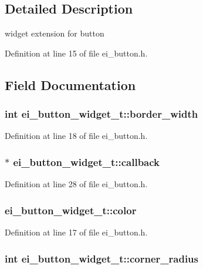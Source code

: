\subsection{Detailed Description}
widget extension for button 

Definition at line 15 of file ei\_\-button.h.

\subsection{Field Documentation}
\hypertarget{structei__button__widget__t_aa2ceeafdf9be60f4d5ef5bb58aa20ca7}{
\subsubsection[{border\_\-width}]{\setlength{\rightskip}{0pt plus 5cm}int {\bf ei\_\-button\_\-widget\_\-t::border\_\-width}}}
\label{structei__button__widget__t_aa2ceeafdf9be60f4d5ef5bb58aa20ca7}


Definition at line 18 of file ei\_\-button.h.\hypertarget{structei__button__widget__t_a74b2646f049211e83783027bd5d2f789}{
\subsubsection[{callback}]{$\ast$ {\bf ei\_\-button\_\-widget\_\-t::callback}}}
\label{structei__button__widget__t_a74b2646f049211e83783027bd5d2f789}


Definition at line 28 of file ei\_\-button.h.\hypertarget{structei__button__widget__t_a4fda3db8c1feae5c9af783ccda98bdaf}{
\subsubsection[{color}]{ {\bf ei\_\-button\_\-widget\_\-t::color}}}
\label{structei__button__widget__t_a4fda3db8c1feae5c9af783ccda98bdaf}


Definition at line 17 of file ei\_\-button.h.\hypertarget{structei__button__widget__t_a39201d2e78e7d968ba66ceaa34d40f87}{
\subsubsection[{corner\_\-radius}]{\setlength{\rightskip}{0pt plus 5cm}int {\bf ei\_\-button\_\-widget\_\-t::corner\_\-radius}}}
\label{structei__button__widget__t_a39201d2e78e7d968ba66ceaa34d40f87}


